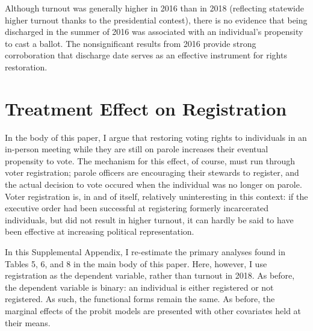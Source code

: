\documentclass[
  12pt,
]{article}
\begin{document}
Although turnout was generally higher in 2016 than in 2018 (reflecting statewide higher turnout thanks to the presidential contest), there is no evidence that being discharged in the summer of 2016 was associated with an individual's propensity to cast a ballot. The nonsignificant results from 2016 provide strong corroboration that discharge date serves as an effective instrument for rights restoration.

\hypertarget{treatment-effect-on-registration}{%
\section*{Treatment Effect on Registration}\label{treatment-effect-on-registration}}

In the body of this paper, I argue that restoring voting rights to individuals in an in-person meeting while they are still on parole increases their eventual propensity to vote. The mechanism for this effect, of course, must run through voter registration; parole officers are encouraging their stewards to register, and the actual decision to vote occured when the individual was no longer on parole. Voter registration is, in and of itself, relatively uninteresting in this context: if the executive order had been successful at registering formerly incarcerated individuals, but did not result in higher turnout, it can hardly be said to have been effective at increasing political representation.

In this Supplemental Appendix, I re-estimate the primary analyses found in Tables 5, 6, and 8 in the main body of this paper. Here, however, I use registration as the dependent variable, rather than turnout in 2018. As before, the dependent variable is binary: an individual is either registered or not registered. As such, the functional forms remain the same. As before, the marginal effects of the probit models are presented with other covariates held at their means.
\end{document}
